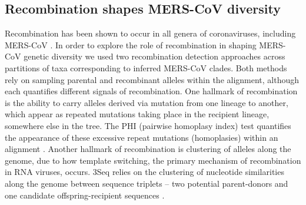 \documentclass[11pt,oneside,letterpaper]{article}
\begin{document}
\subsection*{Recombination shapes MERS-CoV diversity}
Recombination has been shown to occur in all genera of coronaviruses, including MERS-CoV \citep{lai_1985,makino_1986,keck_1988,kottier_1995,herrewegh_1998}.
In order to explore the role of recombination in shaping MERS-CoV genetic diversity we used two recombination detection approaches across partitions of taxa corresponding to inferred MERS-CoV clades.
Both methods rely on sampling parental and recombinant alleles within the alignment, although each quantifies different signals of recombination.
One hallmark of recombination is the ability to carry alleles derived via mutation from one lineage to another, which appear as repeated mutations taking place in the recipient lineage, somewhere else in the tree.
The PHI (pairwise homoplasy index) test quantifies the appearance of these excessive repeat mutations (homoplasies) within an alignment \citep{bruen_simple_2006}.
Another hallmark of recombination is clustering of alleles along the genome, due to how template switching, the primary mechanism of recombination in RNA viruses, occurs.
3Seq relies on the clustering of nucleotide similarities along the genome between sequence triplets -- two potential parent-donors and one candidate offspring-recipient sequences \citep{boni_exact_2007}.
\end{document}
